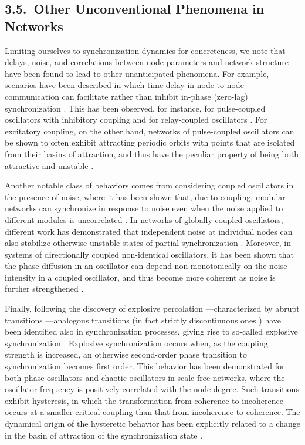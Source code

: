 \documentclass[
preprint,
superscriptaddress,
aps,
prl,
]{revtex4-1}
\begin{document}
 
 {\color{black}
 \subsection{3.5.~Other Unconventional Phenomena in Networks}

Limiting ourselves to synchronization dynamics for concreteness, we note that delays, noise, and correlations between node parameters and network structure have been found to lead to other unanticipated phenomena. For example, scenarios have been described in which time delay in node-to-node communication can facilitate rather than inhibit in-phase (zero-lag) synchronization \cite{atay2004delays}. This has been observed, for instance, for pulse-coupled oscillators with inhibitory coupling \cite{ernst1995synchronization} and for relay-coupled oscillators \cite{fischer2006zero}.  For excitatory coupling, on the other hand, networks of pulse-coupled oscillators can be shown to often  exhibit  
attracting periodic orbits
with points that are isolated from their basins of attraction,  
and thus have the peculiar property of being both attractive and unstable \cite{timme2002prevalence}. 


Another notable class of behaviors comes from considering coupled oscillators in the presence of noise, where it has been shown that, due to coupling, modular networks can synchronize in response to noise even when the noise applied to different modules is uncorrelated \cite{meng2016independent}. In networks of globally coupled oscillators, different work has demonstrated that independent noise at individual nodes can also stabilize otherwise unstable states of partial synchronization \cite{clusella2017noise}.  Moreover, in systems of directionally coupled non-identical oscillators, it has been shown that the phase diffusion in an oscillator can depend non-monotonically on the noise intensity in a coupled oscillator, and thus become more coherent as noise is further strengthened \cite{amro2015phase}.  

Finally, following the discovery of explosive percolation \cite{achlioptas2009explosive}---characterized by abrupt transitions  \cite{da2010explosive,riordan2011explosive,grassberger2011explosive,nagler2011impact}---analogous transitions  (in fact strictly discontinuous ones \cite{vlasov2015explosive}) have been identified also in synchronization processes, giving rise to so-called explosive synchronization \cite{gomez2011explosive}. Explosive synchronization occurs when, as the coupling strength is increased, an otherwise second-order phase transition  to synchronization becomes first order. This behavior has been demonstrated for both 
phase oscillators \cite{gomez2011explosive} and chaotic oscillators \cite{leyva2012explosive} in 
scale-free networks, where the oscillator frequency is positively correlated with the node degree. Such transitions exhibit hysteresis, in which the 
transformation
from coherence to incoherence occurs at a smaller critical coupling than 
that from incoherence to coherence. The dynamical origin of the hysteretic behavior has been explicitly related 
to
a change in the basin of attraction of the synchronization state \cite{zou2014basin}.
}
\end{document}
